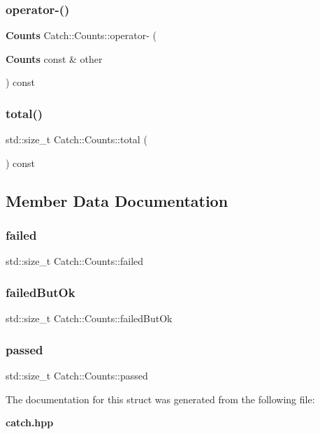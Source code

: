 \subsubsection{operator-\/()}
{\footnotesize\ttfamily \textbf{ Counts} Catch\+::\+Counts\+::operator-\/ (\begin{DoxyParamCaption}\item[{\textbf{ Counts} const \&}]{other }\end{DoxyParamCaption}) const\hspace{0.3cm}{\ttfamily [inline]}}

\mbox{\label{struct_catch_1_1_counts_a94f969c09cf52d1339c085c9603cd1d3}} 
\subsubsection{total()}
{\footnotesize\ttfamily std\+::size\+\_\+t Catch\+::\+Counts\+::total (\begin{DoxyParamCaption}{ }\end{DoxyParamCaption}) const\hspace{0.3cm}{\ttfamily [inline]}}



\subsection{Member Data Documentation}
\mbox{\label{struct_catch_1_1_counts_a19982a3817a3bc2c07f0290e71f497a3}} 
\subsubsection{failed}
{\footnotesize\ttfamily std\+::size\+\_\+t Catch\+::\+Counts\+::failed}

\mbox{\label{struct_catch_1_1_counts_ac090973a2ff51394cd452718e75c073e}} 
\subsubsection{failed\+But\+Ok}
{\footnotesize\ttfamily std\+::size\+\_\+t Catch\+::\+Counts\+::failed\+But\+Ok}

\mbox{\label{struct_catch_1_1_counts_ad28daaf3de28006400208b6dd0c631e6}} 
\subsubsection{passed}
{\footnotesize\ttfamily std\+::size\+\_\+t Catch\+::\+Counts\+::passed}



The documentation for this struct was generated from the following file\+:\begin{DoxyCompactItemize}
\item 
\textbf{ catch.\+hpp}\end{DoxyCompactItemize}

